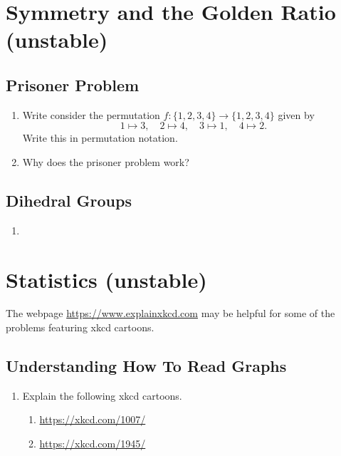 \documentclass[11pt, letterpaper]{article}
\begin{document}
\newpage

\section{Symmetry and the Golden Ratio (unstable)}

\subsection{Prisoner Problem}
\begin{enumerate}
	\item Write consider the permutation $f: \lbrace 1,2,3,4\rbrace \to \lbrace 1,2,3,4\rbrace$ given by 
	 $$ 1 \mapsto 3,  \quad 2 \mapsto 4, \quad 3 \mapsto 1, \quad 4\mapsto 2.$$
	Write this in permutation notation.
	\item Why does the prisoner problem work?
\end{enumerate}

\subsection{Dihedral Groups}
\begin{enumerate}
	\item 
\end{enumerate}

\newpage

\section{Statistics (unstable) }
The webpage \url{https://www.explainxkcd.com} may be helpful for some of the problems featuring xkcd cartoons.
\subsection{Understanding How To Read Graphs}

\begin{enumerate}
	\item Explain the following xkcd cartoons.
	\begin{enumerate}
		\item \url{https://xkcd.com/1007/}
		\item \url{https://xkcd.com/1945/}
	\end{enumerate}
\end{enumerate}
\end{document}
